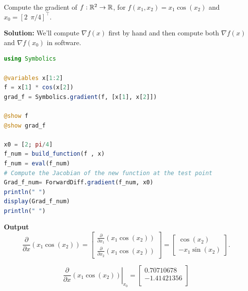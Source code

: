 
\vspace*{.2cm}

\begin{example} 
\label{ex:GradientPartialDerivative} 
Compute the gradient of $f:\mathbb R^2 \to \mathbb R$, for $f(x_1, x_2) = x_1 \cos(x_2)$ and $x_0=[2~~\pi/4]^\top$.
\end{example}

\textbf{Solution:} We'll compute $\nabla f(x)$ first by hand and then compute both $\nabla f(x)$ and $\nabla f(x_0)$ in software. 

\begin{lstlisting}[language=Julia,style=mystyle]
using Symbolics

@variables x[1:2]
f = x[1] * cos(x[2])
grad_f = Symbolics.gradient(f, [x[1], x[2]])

@show f
@show grad_f

x0 = [2; pi/4]
f_num = build_function(f , x)
f_num = eval(f_num)
# Compute the Jacobian of the new function at the test point
Grad_f_num= ForwardDiff.gradient(f_num, x0)
println(" ")
display(Grad_f_num)
println(" ")

\end{lstlisting}
\textbf{Output} 
$$ \frac{\partial}{\partial x}\left(x_1 \cos(x_2) \right)= \left[\begin{array}{c}
        \frac{\partial }{\partial x_1} \left(x_1 \cos(x_2) \right)\\  \frac{\partial }{\partial x_2} \left(x_1 \cos(x_2) \right)
    \end{array} \right] = \left[\begin{array}{c}
       \cos(x_2)\\  -x_1 \sin(x_2) 
    \end{array} \right].$$


$$ \left. \frac{\partial}{\partial x}\left(x_1 \cos(x_2) \right) \right|_{x_0}=
\left[
\begin{array}{r}
0.70710678 \\
-1.41421356 \\
\end{array}
\right]
$$
\Qed

